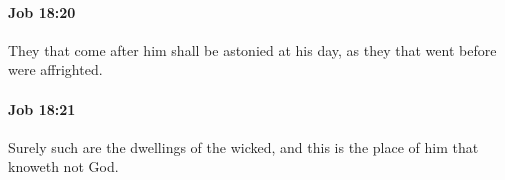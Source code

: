 		\paragraph{Job 18:20} %
			\label{JOB-18-20}

			They that come after him shall be astonied at his day, as they that went before were affrighted.


		\paragraph{Job 18:21} %
			\label{JOB-18-21}

			Surely such are the dwellings of the wicked, and this is the place of him that knoweth not God.

